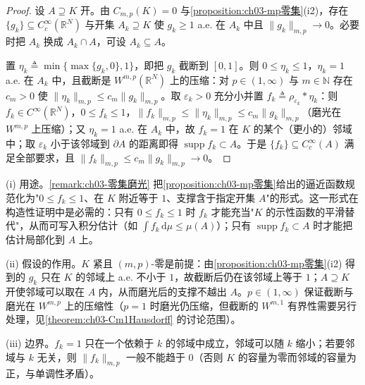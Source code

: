 \documentclass[../../main.tex]{subfiles}%
\begin{document}
\begin{proof}
设 $A\supseteq K$ 开。由 $C_{m,p}(K)=0$ 与\cref{proposition:ch03-mp零集}(i2)，存在 $\{g_k\}\subseteq C^\infty_c(\mathbb{R}^N)$ 与开集 $A_k\supseteq K$ 使 $g_k\geqslant1$ a.e. 在 $A_k$ 中且 $\|g_k\|_{m,p}\to0$。必要时把 $A_k$ 换成 $A_k\cap A$，可设 $A_k\subseteq A$。

置 $\eta_k\triangleq\min\{\max\{g_k,0\},1\}$，即把 $g_k$ 截断到 $[0,1]$。则 $0\leqslant\eta_k\leqslant1$，$\eta_k=1$ a.e. 在 $A_k$ 中，且截断是 $W^{m,p}(\mathbb{R}^N)$ 上的压缩：对 $p\in(1,\infty)$ 与 $m\in\mathbb{N}$ 存在 $c_m>0$ 使 $\|\eta_k\|_{m,p}\leqslant c_m\|g_k\|_{m,p}$。取 $\varepsilon_k>0$ 充分小并置 $f_k\triangleq\rho_{\varepsilon_k}*\eta_k$：则 $f_k\in C^\infty(\mathbb{R}^N)$，$0\leqslant f_k\leqslant1$，$\|f_k\|_{m,p}\leqslant\|\eta_k\|_{m,p}\leqslant c_m\|g_k\|_{m,p}$（磨光在 $W^{m,p}$ 上压缩）；又 $\eta_k=1$ a.e. 在 $A_k$ 中，故 $f_k=1$ 在 $K$ 的某个（更小的）邻域中；取 $\varepsilon_k$ 小于该邻域到 $\partial A$ 的距离即得 $\operatorname{supp}f_k\subset A$。于是 $\{f_k\}\subseteq C^\infty_c(A)$ 满足全部要求，且 $\|f_k\|_{m,p}\leqslant c_m\|g_k\|_{m,p}\to0$。
\end{proof}

\begin{remark}\label{remark:ch03-零集磨光动机}
(i) 用途。\cref{remark:ch03-零集磨光} 把\cref{proposition:ch03-mp零集}给出的逼近函数规范化为"$0\leqslant f_k\leqslant1$、在 $K$ 附近等于 $1$、支撑含于指定开集 $A$"的形式。这一形式在构造性证明中是必需的：只有 $0\leqslant f_k\leqslant1$ 时 $f_k$ 才能充当"$K$ 的示性函数的平滑替代"，从而可写入积分估计（如 $\int f_k\,\mathrm{d}\mu\leqslant\mu(A)$）；只有 $\operatorname{supp}f_k\subset A$ 时才能把估计局部化到 $A$ 上。

(ii) 假设的作用。$K$ 紧且 $(m,p)$-零是前提：由\cref{proposition:ch03-mp零集}(i2) 得到的 $g_k$ 只在 $K$ 的邻域上 a.e. 不小于 $1$，故截断后仍在该邻域上等于 $1$；$A\supseteq K$ 开使邻域可以取在 $A$ 内，从而磨光后的支撑不越出 $A$。$p\in(1,\infty)$ 保证截断与磨光在 $W^{m,p}$ 上的压缩性（$p=1$ 时磨光仍压缩，但截断的 $W^{m,1}$ 有界性需要另行处理，见\cref{theorem:ch03-Cm1Hausdorff} 的讨论范围）。

(iii) 边界。$f_k=1$ 只在一个依赖于 $k$ 的邻域中成立，邻域可以随 $k$ 缩小；若要邻域与 $k$ 无关，则 $\|f_k\|_{m,p}$ 一般不能趋于 $0$（否则 $K$ 的容量为零而邻域的容量为正，与单调性矛盾）。
\end{remark}
\end{document}
